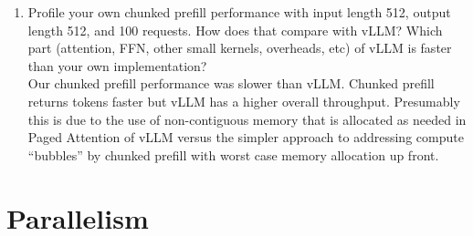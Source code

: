 \documentclass[12pt]{article}
\begin{document}
\begin{enumerate}[label=\textbf{Q\arabic*.}]
\begin{enumerate}
        \item Profile your own chunked prefill performance with input length 512, output length 512, and 100 requests. How does that compare with vLLM? Which part (attention, FFN, other small kernels, overheads, etc) of vLLM is faster than your own implementation? \\

        Our chunked prefill performance was slower than vLLM. Chunked prefill returns tokens faster but vLLM has a higher overall throughput. Presumably this is due to the use of non-contiguous memory that is allocated as needed in Paged Attention of vLLM versus the simpler approach to addressing compute ``bubbles'' by chunked prefill with worst case memory allocation up front.

    \end{enumerate}
    
\end{enumerate}

\section{Parallelism}
\end{document}
